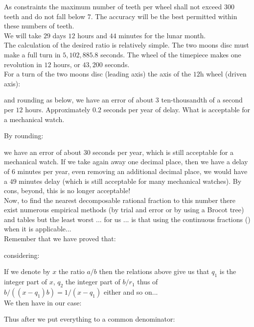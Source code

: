 	\pagebreak
	\begin{tcolorbox}[colframe=black,colback=white,sharp corners]
	As constraints the maximum number of teeth per wheel shall not exceed $300$ teeth and do not fall below $7$. The accuracy will be the best permitted within these numbers of teeth.\\
	
	We will take $29$ days $12$ hours and $44$ minutes for the lunar month.\\
		
	The calculation of the desired ratio is relatively simple. The two moons disc must make a full turn in $5,102,885.8$ seconds. The wheel of the timepiece makes one revolution in $12$ hours, or $43,200$ seconds.\\
		
	For a turn of the two moons disc (leading axis) the axis of the $12$h wheel (driven axis):
	
	and rounding as below, we have an error of about $3$ ten-thousandth of a second per $12$ hours. Approximately $0.2$ seconds per year of delay. What is acceptable for a mechanical watch.

	By rounding:
	
	we have an error of about $30$ seconds per year, which is still acceptable for a mechanical watch. If we take again away one decimal place, then we have a delay of $6$ minutes per year, even removing an additional decimal place, we would have a $49$ minutes delay (which is still acceptable for many mechanical watches). By cons, beyond, this is no longer acceptable!\\
	
	Now, to find the nearest decomposable rational fraction to this number there exist numerous empirical methods (by trial and error or by using a Brocot tree) and tables but the least worst ... for us ... is that using the continuous fractions () when it is applicable...\\
	
	Remember that we have proved that:
	
	\end{tcolorbox}
	
	\pagebreak
	\begin{tcolorbox}[colframe=black,colback=white,sharp corners]
	considering:
	
	If we denote by $x$ the ratio $a / b$ then the relations above give us that $q_1$ is the integer part of $x$, $q_2$ the integer part of $b/r_1$ thus of $b/((x-q_1)b)=1/(x-q_1)$ either and so on...\\
	
	We then have in our case:
	
	Thus after we put everything to a common denominator:
	
	\end{tcolorbox}
	
